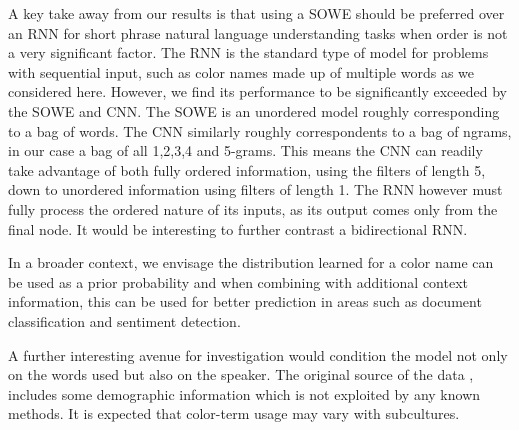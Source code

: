 \documentclass[]{book}
\newcommand{\textcite}{\citet}
\begin{document}
A key take away from our results is that using a SOWE should be preferred over an RNN for short phrase natural language understanding tasks when order is not a very significant factor.
The RNN is the standard type of model for problems with sequential input, such as color names made up of multiple words as we considered here.
However, we find its performance to be significantly exceeded by the SOWE and CNN.
The SOWE is an unordered model roughly corresponding to a bag of words.
The CNN similarly roughly correspondents to a bag of ngrams, in our case a bag of all 1,2,3,4 and 5-grams.
This means the CNN can readily take advantage of both fully ordered information, using the filters of length 5, down to unordered information using  filters of length 1.
The RNN however must fully process the ordered nature of its inputs, as its output comes only from the final node.
It would be interesting to further contrast a bidirectional RNN.

In a broader context, we envisage the distribution learned for a color name can be used as a prior probability and when combining with additional context information, this can be used for better prediction in areas such as document classification and sentiment detection.

A further interesting avenue for investigation would condition the model not only on the words used but also on the speaker.
The original source of the data \textcite{Munroe2010XKCDdataset}, includes some demographic information which is not exploited by any known methods.
It is expected that color-term usage may vary with subcultures.


\clearpage


\clearpage
\appendix

\end{document}
